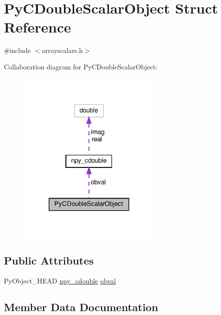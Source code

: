 \hypertarget{structPyCDoubleScalarObject}{}\section{Py\+C\+Double\+Scalar\+Object Struct Reference}
\label{structPyCDoubleScalarObject}


{\ttfamily \#include $<$arrayscalars.\+h$>$}



Collaboration diagram for Py\+C\+Double\+Scalar\+Object\+:
\nopagebreak
\begin{figure}[H]
\begin{center}
\leavevmode
\includegraphics[width=203pt]{structPyCDoubleScalarObject__coll__graph}
\end{center}
\end{figure}
\subsection*{Public Attributes}
\begin{DoxyCompactItemize}
\item 
Py\+Object\+\_\+\+H\+E\+AD \hyperlink{structnpy__cdouble}{npy\+\_\+cdouble} \hyperlink{structPyCDoubleScalarObject_ab1fabad1121738df8e8eeeb6f751d1a3}{obval}
\end{DoxyCompactItemize}


\subsection{Member Data Documentation}
\mbox{\label{structPyCDoubleScalarObject_ab1fabad1121738df8e8eeeb6f751d1a3}} 
